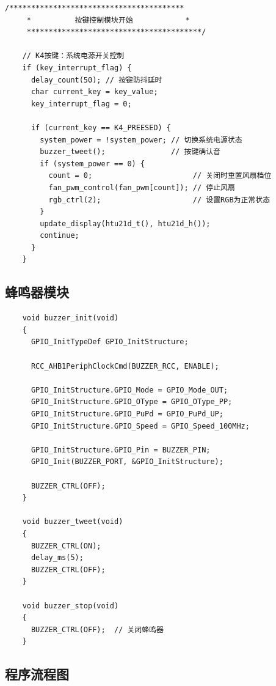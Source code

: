 \begin{lstlisting}[caption={部分按键控制模块}]
    /****************************************
     *          按键控制模块开始            *
     ****************************************/

    // K4按键：系统电源开关控制
    if (key_interrupt_flag) {
      delay_count(50); // 按键防抖延时
      char current_key = key_value;
      key_interrupt_flag = 0;

      if (current_key == K4_PREESED) {
        system_power = !system_power; // 切换系统电源状态
        buzzer_tweet();               // 按键确认音
        if (system_power == 0) {
          count = 0;                       // 关闭时重置风扇档位
          fan_pwm_control(fan_pwm[count]); // 停止风扇
          rgb_ctrl(2);                     // 设置RGB为正常状态
        }
        update_display(htu21d_t(), htu21d_h());
        continue;
      }
    }
\end{lstlisting}

\subsection{蜂鸣器模块}

\begin{lstlisting}
    void buzzer_init(void)
    {
      GPIO_InitTypeDef GPIO_InitStructure;

      RCC_AHB1PeriphClockCmd(BUZZER_RCC, ENABLE);

      GPIO_InitStructure.GPIO_Mode = GPIO_Mode_OUT;
      GPIO_InitStructure.GPIO_OType = GPIO_OType_PP;
      GPIO_InitStructure.GPIO_PuPd = GPIO_PuPd_UP;
      GPIO_InitStructure.GPIO_Speed = GPIO_Speed_100MHz;

      GPIO_InitStructure.GPIO_Pin = BUZZER_PIN;
      GPIO_Init(BUZZER_PORT, &GPIO_InitStructure);

      BUZZER_CTRL(OFF);
    }

    void buzzer_tweet(void)
    {
      BUZZER_CTRL(ON);
      delay_ms(5);
      BUZZER_CTRL(OFF);
    }

    void buzzer_stop(void)
    {
      BUZZER_CTRL(OFF);  // 关闭蜂鸣器
    }
\end{lstlisting}

\newpage

\subsection{程序流程图}

